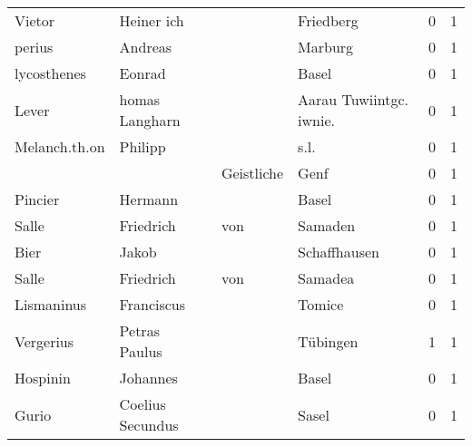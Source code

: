 \begin{center}
\begin{tiny}
\begin{longtabu}{llllrr}
                   Vietor &                         Heiner ich &             &                                   Friedberg &          0 &         1 \\
                   perius &                            Andreas &             &                                     Marburg &          0 &         1 \\
              lycosthenes &                             Eonrad &             &                                       Basel &          0 &         1 \\
                    Lever &                     homas Langharn &             &                    Aarau Tuwiintgc. iwnie.  &          0 &         1 \\
            Melanch.th.on &                            Philipp &             &                                        s.l. &          0 &         1 \\
                          &                                    &  Geistliche &                                        Genf &          0 &         1 \\
                  Pincier &                            Hermann &             &                                       Basel &          0 &         1 \\
                    Salle &                          Friedrich &         von &                                     Samaden &          0 &         1 \\
                     Bier &                              Jakob &             &                                Schaffhausen &          0 &         1 \\
                    Salle &                          Friedrich &         von &                                     Samadea &          0 &         1 \\
               Lismaninus &                         Franciscus &             &                                      Tomice &          0 &         1 \\
                Vergerius &                      Petras Paulus &             &                                    Tübingen &          1 &         1 \\
                 Hospinin &                           Johannes &             &                                       Basel &          0 &         1 \\
                    Gurio &                   Coelius Secundus &             &                                       Sasel &          0 &         1 \\

\end{longtabu}
\end{tiny}
\end{center}
